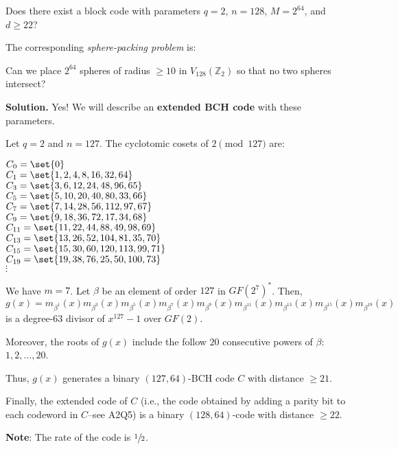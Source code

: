 \begin{Example}{}{}
    Does there exist a block code with parameters
    $ q=2 $, $ n=128 $, $ M=2^{64} $, and $ d\geqslant 22 $?

    The corresponding \emph{sphere-packing problem} is:

    Can we place $ 2^{64} $ spheres of radius
    $ \geqslant 10 $ in $ V_{128}(\mathbb{Z}_2) $
    so that no two spheres intersect?

    \textbf{Solution.} Yes! We will describe an
    \textbf{extended BCH code} with these parameters.

    Let $ q=2 $ and $ n=127 $. The cyclotomic cosets
    of $ 2\pmod{127} $ are:

    \begin{center}
        \begin{multicols}{2}
            $ C_0=\set{0} $\\
            $ C_1=\set{1,2,4,8,16,32,64} $\\
            $ C_3=\set{3,6,12,24,48,96,65} $\\
            $ C_5=\set{5,10,20,40,80,33,66} $\\
            $ C_7=\set{7,14,28,56,112,97,67} $\\
            $ C_9=\set{9,18,36,72,17,34,68} $\\
            $ C_{11}=\set{11,22,44,88,49,98,69} $\\
            $ C_{13}=\set{13,26,52,104,81,35,70} $\\
            $ C_{15}=\set{15,30,60,120,113,99,71} $\\
            $ C_{19}=\set{19,38,76,25,50,100,73} $\\
            $ \vdots $
        \end{multicols}
    \end{center}

    We have $ m=7 $. Let $ \beta $ be an element of order $ 127 $
    in $ GF(2^7)^* $. Then,
    \[ g(x)=m_{\beta^1}(x)m_{\beta^3}(x)m_{\beta^5}(x)m_{\beta^7}(x)
        m_{\beta^9}(x)m_{\beta^{11}}(x)m_{\beta^{13}}(x)
        m_{\beta^{15}}(x)m_{\beta^{19}}(x) \]
    is a degree-$ 63 $ divisor of $ x^{127}-1 $ over $ GF(2) $.

    Moreover, the roots of $ g(x) $ include the follow $ 20 $
    consecutive powers of $ \beta $: $ 1,2,\ldots ,20 $.

    Thus, $ g(x) $ generates a binary $ (127,64) $-BCH code
    $ C $ with distance $ \geqslant 21 $.

    Finally, the extended code of $ C $ (i.e., the code obtained
    by adding a parity bit to each codeword in $ C $--see A2Q5) is
    a binary $ (128,64) $-code with distance $ \geqslant 22 $.

    \textbf{Note}: The rate of the code is $ \sfrac{1}{2} $.
\end{Example}

